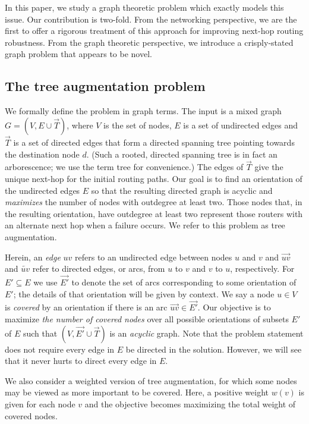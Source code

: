 \documentclass{article}
\begin{document}
In this paper, we study a graph theoretic problem which exactly models
this issue. Our contribution
is two-fold. From the networking perspective, we are the first to
offer a rigorous treatment of this approach for improving next-hop
routing robustness. From the graph theoretic perspective, we introduce a
crisply-stated graph problem that appears to be novel.

\subsection{The {\sc tree augmentation} problem}

We formally define the problem in graph terms.  The input is a mixed
graph $G=(V, E\cup \overrightarrow T)$, where $V$ is the set of nodes,
$E$ is a set of undirected edges and $\overrightarrow T$ is a set of
directed edges that form a directed spanning tree pointing towards the
destination node $d$.  (Such a rooted, directed spanning tree is in
fact an arborescence; we use the term tree for convenience.)  The
edges of $\overrightarrow T$ give the unique next-hop for the initial
routing paths.  Our goal is to find an orientation of the undirected
edges $E$ so that the resulting directed graph is acyclic and {\em
  maximizes} the number of nodes with outdegree at least two. Those
nodes that, in the resulting orientation, have outdegree at least two
represent those routers with an alternate next hop when a failure occurs. We
refer to this problem as {\sc tree augmentation}.

Herein, an {\em edge} $uv$ refers to an undirected edge between nodes
$u$ and $v$ and $\overrightarrow{uv}$ and $\overleftarrow{uv}$ refer
to directed edges, or arcs, from $u$ to $v$ and $v$ to $u$, respectively. 
For $E' \subseteq E$ we use $\overrightarrow{E'}$ to denote the set
of arcs corresponding to some orientation of $E'$; the details of that
orientation will be given by context.  We say a node $u \in V$ is {\em
covered} by an orientation if there is an arc $\overrightarrow{uv} \in
\overrightarrow{E'}$.  Our objective is to maximize {\em the number of
covered nodes} over all possible orientations of subsets $E'$ of $E$
such that $(V, \overrightarrow{E'} \cup \overrightarrow T)$ is an {\em
acyclic} graph.  Note that the problem statement does not require
every edge in $E$ be directed in the solution. However, we will see
that it never hurts to direct every edge in $E$.

We also consider a weighted version of {\sc tree augmentation}, for
which some nodes may be viewed as more important to be covered. Here,
a positive weight $w(v)$ is given for each node $v$ and the objective
becomes maximizing the total weight of covered nodes.
\end{document}
